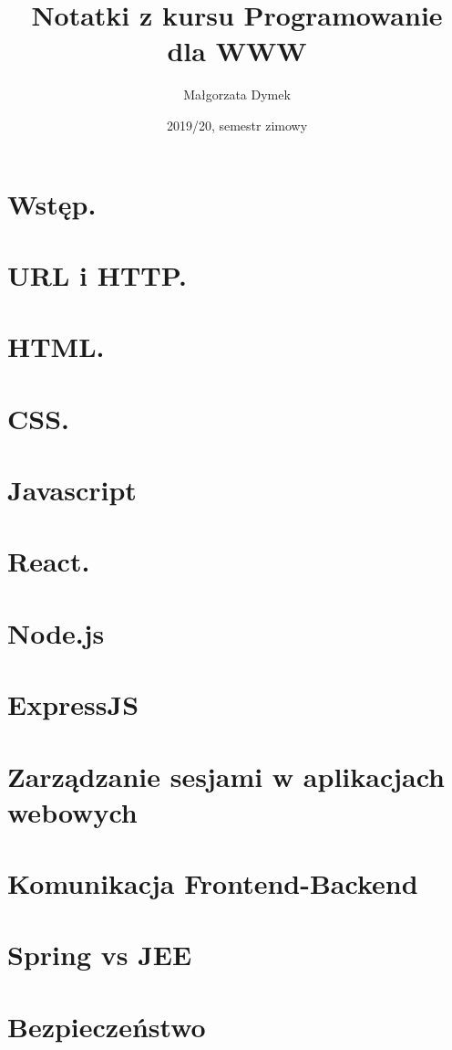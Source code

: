 \documentclass[a4paper]{article}
\title{Notatki z kursu Programowanie dla WWW}
\author{Małgorzata Dymek}
\date{2019/20, semestr zimowy}
\begin{document}
    \maketitle

    \section{Wstęp.}
    

    \section{URL i HTTP.}
    
    

    \section{HTML.}
    

    \section{CSS.}
    

    \section{Javascript}
    

    \section{React.}
    

    \section{Node.js}
    

    \section{ExpressJS}
    

    \section{Zarządzanie sesjami w aplikacjach webowych}
    

    \section{Komunikacja Frontend-Backend}
    

    \section{Spring vs JEE}
    

    \section{Bezpieczeństwo}
    
\end{document}
